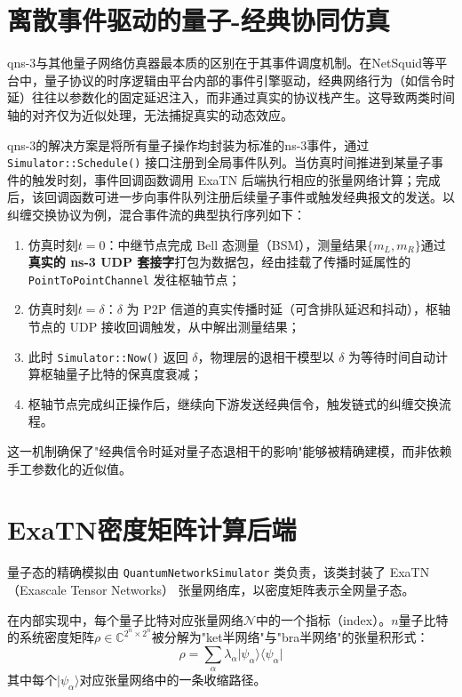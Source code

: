 \section{离散事件驱动的量子-经典协同仿真}
\label{sec:discrete-event}

qns-3与其他量子网络仿真器最本质的区别在于其事件调度机制。在NetSquid等平台中，量子协议的时序逻辑由平台内部的事件引擎驱动，经典网络行为（如信令时延）往往以参数化的固定延迟注入，而非通过真实的协议栈产生。这导致两类时间轴的对齐仅为近似处理，无法捕捉真实的动态效应。

qns-3的解决方案是将所有量子操作均封装为标准的ns-3事件，通过 \texttt{Simulator::Schedule()} 接口注册到全局事件队列。当仿真时间推进到某量子事件的触发时刻，事件回调函数调用 ExaTN 后端执行相应的张量网络计算；完成后，该回调函数可进一步向事件队列注册后续量子事件或触发经典报文的发送。以纠缠交换协议为例，混合事件流的典型执行序列如下：

\begin{enumerate}
  \item 仿真时刻$t=0$：中继节点完成 Bell 态测量（BSM），测量结果$\{m_L, m_R\}$通过\textbf{真实的 ns-3 UDP 套接字}打包为数据包，经由挂载了传播时延属性的 \texttt{PointToPointChannel} 发往枢轴节点；
  \item 仿真时刻$t=\delta$：$\delta$ 为 P2P 信道的真实传播时延（可含排队延迟和抖动），枢轴节点的 UDP 接收回调触发，从中解出测量结果；
  \item 此时 \texttt{Simulator::Now()} 返回 $\delta$，物理层的退相干模型以 $\delta$ 为等待时间自动计算枢轴量子比特的保真度衰减；
  \item 枢轴节点完成纠正操作后，继续向下游发送经典信令，触发链式的纠缠交换流程。
\end{enumerate}

这一机制确保了"经典信令时延对量子态退相干的影响"能够被精确建模，而非依赖手工参数化的近似值。

\section{ExaTN密度矩阵计算后端}
\label{sec:exatn}

量子态的精确模拟由 \texttt{QuantumNetworkSimulator} 类负责，该类封装了 ExaTN（Exascale Tensor Networks）\cite{lyakh2019exatn} 张量网络库，以密度矩阵表示全网量子态。

在内部实现中，每个量子比特对应张量网络$\mathcal{N}$中的一个指标（index）。$n$量子比特的系统密度矩阵$\rho \in \mathbb{C}^{2^n \times 2^n}$被分解为"ket半网络"与"bra半网络"的张量积形式：
\begin{equation}
  \rho = \sum_{\alpha} \lambda_\alpha \vert\psi_\alpha\rangle\langle\psi_\alpha\vert
  \label{eq:density-matrix}
\end{equation}
其中每个$\vert\psi_\alpha\rangle$对应张量网络中的一条收缩路径。

